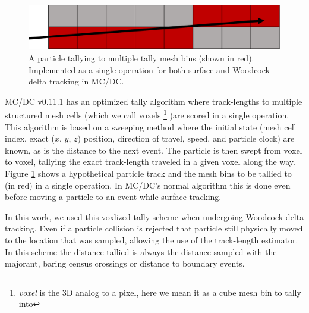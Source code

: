 \begin{figure}[!htb]
  \centering
  \includegraphics[width=\textwidth]{monte_carlo/delta_tracking/figures/tally_ray.pdf}
  \caption{A particle tallying to multiple tally mesh bins (shown in red). Implemented as a single operation for both surface and Woodcock-delta tracking in MC/DC.}
  \label{fig:tally_ray}
\end{figure}

MC/DC v0.11.1 \cite{morgan_monte_2024} has an optimized tally algorithm where track-lengths to multiple structured mesh cells (which we call voxels
\footnote{\textit{voxel} is the 3D analog to a pixel, here we mean it as a cube mesh bin to tally into}
)are scored in a single operation.
This algorithm is based on a sweeping method where the initial state (mesh cell index, exact ($x$, $y$, $z$) position, direction of travel, speed, and particle clock) are known, as is the distance to the next event.
The particle is then swept from voxel to voxel, tallying the exact track-length traveled in a given voxel along the way.
Figure \ref{fig:tally_ray} shows a hypothetical particle track and the mesh bins to be tallied to (in red) in a single operation.
In MC/DC's normal algorithm this is done even before moving a particle to an event while surface tracking.

In this work, we used this voxlized tally scheme when undergoing Woodcock-delta tracking.
Even if a particle collision is rejected that particle still physically moved to the location that was sampled, allowing the use of the track-length estimator.
In this scheme the distance tallied is always the distance sampled with the majorant, baring census crossings or distance to boundary events.

